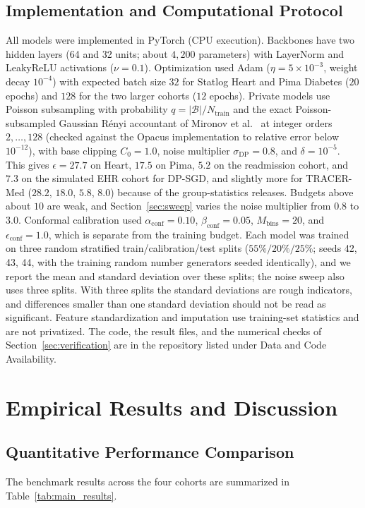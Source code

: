 \documentclass[3p,12pt]{elsarticle}
\theoremstyle{plain}
\theoremstyle{definition}
\begin{document}
\subsection{Implementation and Computational Protocol}
All models were implemented in PyTorch (CPU execution). Backbones have two hidden layers (64 and 32 units; about $4{,}200$ parameters) with LayerNorm and LeakyReLU activations ($\nu = 0.1$). Optimization used Adam ($\eta = 5 \times 10^{-3}$, weight decay $10^{-4}$) with expected batch size $32$ for Statlog Heart and Pima Diabetes ($20$ epochs) and $128$ for the two larger cohorts ($12$ epochs). Private models use Poisson subsampling with probability $q = |\mathcal{B}|/N_{\text{train}}$ and the exact Poisson-subsampled Gaussian R\'enyi accountant of Mironov et al.~\cite{mironov2019renyi} at integer orders $2,\dots,128$ (checked against the Opacus implementation to relative error below $10^{-12}$), with base clipping $C_0=1.0$, noise multiplier $\sigma_{\text{DP}}=0.8$, and $\delta = 10^{-5}$. This gives $\epsilon = 27.7$ on Heart, $17.5$ on Pima, $5.2$ on the readmission cohort, and $7.3$ on the simulated EHR cohort for DP-SGD, and slightly more for TRACER-Med ($28.2$, $18.0$, $5.8$, $8.0$) because of the group-statistics releases. Budgets above about $10$ are weak, and Section~\ref{sec:sweep} varies the noise multiplier from $0.8$ to $3.0$. Conformal calibration used $\alpha_{\text{conf}} = 0.10$, $\beta_{\text{conf}} = 0.05$, $M_{\text{bins}} = 20$, and $\epsilon_{\text{conf}} = 1.0$, which is separate from the training budget. Each model was trained on three random stratified train/calibration/test splits ($55\%/20\%/25\%$; seeds 42, 43, 44, with the training random number generators seeded identically), and we report the mean and standard deviation over these splits; the noise sweep also uses three splits. With three splits the standard deviations are rough indicators, and differences smaller than one standard deviation should not be read as significant. Feature standardization and imputation use training-set statistics and are not privatized. The code, the result files, and the numerical checks of Section~\ref{sec:verification} are in the repository listed under Data and Code Availability.

\section{Empirical Results and Discussion}
\label{sec:results}

\subsection{Quantitative Performance Comparison}
The benchmark results across the four cohorts are summarized in Table~\ref{tab:main_results}.
\end{document}
